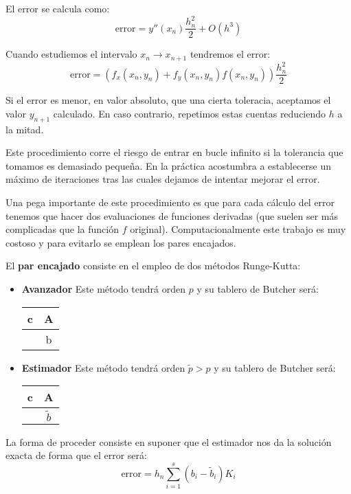 El error se calcula como:
\[\text{error} = y''(x_n)\frac{h_n^2}{2}+O(h^3)\]

Cuando estudiemos el intervalo $x_n \to x_{n+1}$ tendremos el error:
\[\text{error} = \left(f_x(x_n,y_n)+f_y(x_n,y_n)f(x_n,y_n) \right)\frac{h_n^2}{2}\]

Si el error es menor, en valor absoluto, que una cierta toleracia, aceptamos el valor $y_{n+1}$ calculado. En caso contrario, repetimos estas cuentas reduciendo $h$ a la mitad.

\obs Este procedimiento corre el riesgo de entrar en bucle infinito si la tolerancia que tomamos es demasiado pequeña. En la práctica acostumbra a establecerse un máximo de iteraciones tras las cuales dejamos de intentar mejorar el error.

Una pega importante de este procedimiento es que para cada cálculo del error tenemos que hacer dos evaluaciones de funciones derivadas (que suelen ser más complicadas que la función $f$ original). Computacionalmente este trabajo es muy costoso y para evitarlo se emplean los pares encajados.

El \textbf{par encajado} consiste en el empleo de dos métodos Runge-Kutta:
\begin{itemize}
\item \textbf{Avanzador}
Este método tendrá orden $p$ y su tablero de Butcher será:

\begin{center}
\begin{tabular}{c|c}
c & A \\
\hline
 & b\\
\end{tabular}
\end{center}


\item \textbf{Estimador}
Este método tendrá orden $\tilde{p}>p$ y su tablero de Butcher será:

\begin{center}
\begin{tabular}{c|c}
c & A \\
\hline
 & $\tilde{b}$\\
\end{tabular}
\end{center}
\end{itemize}

La forma de proceder consiste en suponer que el estimador nos da la solución exacta de forma que el error será:
\[\text{error} = h_n \sum_{i=1}^s(b_i-\tilde{b}_i)K_i\]

